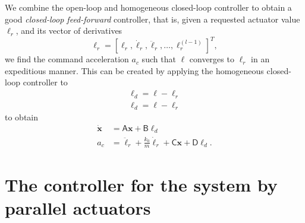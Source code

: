 \documentclass[oneside,twocolumn,reqno]{amsart}
\newcommand\tint{{\textstyle\int\!}}
\begin{document}
We combine the open-loop and homogeneous closed-loop controller to obtain a good \emph{closed-loop feed-forward} controller, that is, given a requested actuator value $\ell_r$, and its vector of derivatives
\begin{equation}
\bm \ell_r = [\ell_r, \dot \ell_r, \ddot \ell_r, \dots, \ell_r^{(l-1)}]^T ,
\end{equation}
we find the command acceleration $a_c$ such that $\ell$ converges to $\ell_r$ in an expeditious manner.  This can be created by applying the homogeneous closed-loop controller to
\begin{gather}
\label{y_d}
\ell_d = \ell - \ell_r\\
\label{y_d b}
\bm \ell_d = \bm \ell - \bm \ell_r
\end{gather}
to obtain
\begin{align}
\label{closed-loop feed-forward}
\dot {\bm x} &= \mathsf A \bm x + \mathsf B \ell_d \\
\label{closed-loop feed-forward 2}
a_c &= \ddot \ell_r + \frac{k_0}m \dot \ell_r + \mathsf C \bm x + \mathsf D \bm \ell_d.
\end{align}

\section{The controller for the system by parallel actuators}
\label{sec parallel}
\end{document}
